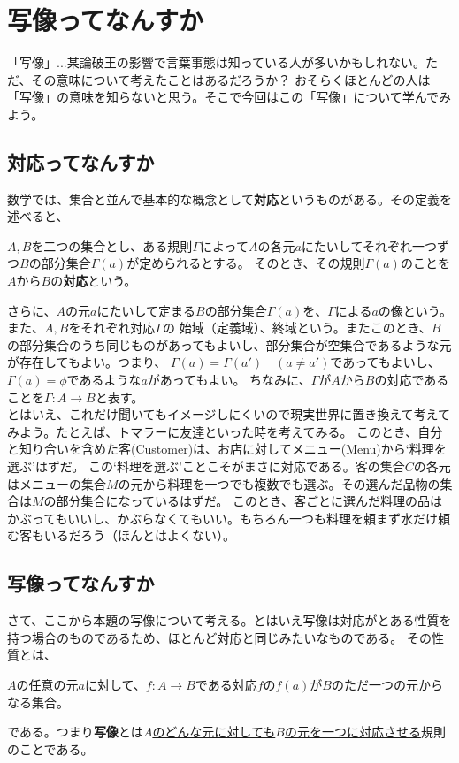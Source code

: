 \documentclass[a4j,dvipdfmx]{jsarticle}
\begin{document}
\section*{写像ってなんすか}
「写像」...某論破王の影響で言葉事態は知っている人が多いかもしれない。ただ、その意味について考えたことはあるだろうか？
おそらくほとんどの人は「写像」の意味を知らないと思う。そこで今回はこの「写像」について学んでみよう。

\subsection{対応ってなんすか}
数学では、集合と並んで基本的な概念として\textbf{対応}というものがある。その定義を述べると、
\begin{screen}
    $A,B$を二つの集合とし、ある規則$\Gamma$によって$A$の各元$a$にたいしてそれぞれ一つずつ$B$の部分集合$\Gamma(a)$が定められるとする。
    そのとき、その規則$\Gamma(a)$のことを$A$から$B$の\textbf{対応}という。
\end{screen}
さらに、$A$の元$a$にたいして定まる$B$の部分集合$\Gamma(a)$を、$\Gamma$による$a$の像という。また、$A,B$をそれぞれ対応$\Gamma$の
始域（定義域）、終域という。またこのとき、$B$の部分集合のうち同じものがあってもよいし、部分集合が空集合であるような元が存在してもよい。つまり、
$\Gamma(a)=\Gamma(a')\quad(a\neq a')$であってもよいし、$\Gamma(a)=\phi$であるような$a$があってもよい。
ちなみに、$\Gamma$が$A$から$B$の対応であることを$\Gamma:A\to B$と表す。\\

とはいえ、これだけ聞いてもイメージしにくいので現実世界に置き換えて考えてみよう。たとえば、トマラーに友達といった時を考えてみる。
このとき、自分と知り合いを含めた客(Customer)は、お店に対してメニュー(Menu)から`料理を選ぶ'はずだ。
この`料理を選ぶ'ことこそがまさに対応である。客の集合$C$の各元はメニューの集合$M$の元から料理を一つでも複数でも選ぶ。その選んだ品物の集合は$M$の部分集合になっているはずだ。
このとき、客ごとに選んだ料理の品はかぶってもいいし、かぶらなくてもいい。もちろん一つも料理を頼まず水だけ頼む客もいるだろう（ほんとはよくない）。\\

\subsection{写像ってなんすか}
さて、ここから本題の写像について考える。とはいえ写像は対応がとある性質を持つ場合のものであるため、ほとんど対応と同じみたいなものである。
その性質とは、
\begin{screen}
    $A$の任意の元$a$に対して、$f:A\to B$である対応$f$の$f(a)$が$B$のただ一つの元からなる集合。
\end{screen}
である。つまり\textbf{写像}とは\underline{$A$のどんな元に対しても$B$の元を一つに対応させる}規則のことである。\\
\end{document}
